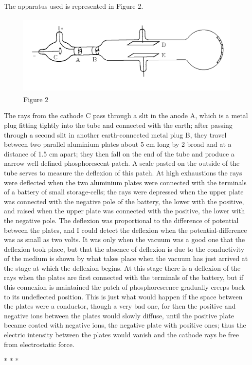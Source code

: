 The apparatus used is represented in Figure 2.

\begin{figure}[h]
  \begin{center}
    \includegraphics[width=4.69333in,height=1.6in]{images/02_thomson/image009.png}
  \end{center}
  \caption*{Figure 2}
\end{figure}

The rays from the cathode C pass through a slit in the anode A, which is
a metal plug fitting tightly into the tube and connected with the earth;
after passing through a second slit in another earth-connected metal
plug B, they travel between two parallel aluminium plates about 5 cm
long by 2 broad and at a distance of 1.5 cm apart; they then fall on the
end of the tube and produce a narrow well-defined phosphorescent patch.
A scale pasted on the outside of the tube serves to measure the
deflexion of this patch. At high exhaustions the rays were deflected
when the two aluminium plates were connected with the terminals of a
battery of small storage-cells; the rays were depressed when the upper
plate was connected with the negative pole of the battery, the lower
with the positive, and raised when the upper plate was connected with
the positive, the lower with the negative pole. The deflexion was
proportional to the difference of potential between the plates, and I
could detect the deflexion when the potential-difference was as small as
two volts. It was only when the vacuum was a good one that the deflexion
took place, but that the absence of deflexion is due to the conductivity
of the medium is shown by what takes place when the vacuum has just
arrived at the stage at which the deflexion begins. At this stage there
is a deflexion of the rays when the plates are first connected with the
terminals of the battery, but if this connexion is maintained the patch
of phosphorescence gradually creeps back to its undeflected position.
This is just what would happen if the space between the plates were a
conductor, though a very bad one, for then the positive and negative
ions between the plates would slowly diffuse, until the positive plate
became coated with negative ions, the negative plate with positive ones;
thus the electric intensity between the plates would vanish and the
cathode rays be free from electrostatic force.\\
\centerline{* * *}
%
